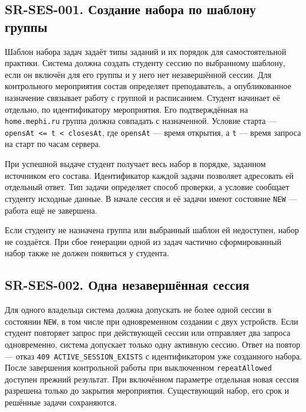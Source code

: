 \documentclass[12pt,a4paper]{article}
\begin{document}
\subsection{SR-SES-001. Создание набора по шаблону группы}\label{sr-ses-001-ux441ux43eux437ux434ux430ux43dux438ux435-ux43dux430ux431ux43eux440ux430-ux43fux43e-ux448ux430ux431ux43bux43eux43dux443-ux433ux440ux443ux43fux43fux44b}

\hypertarget{sr-ses-001-создание-набора-по-шаблону-группы}{}

\hypertarget{sr-ses-001}{}

Шаблон набора задач задаёт типы заданий и их порядок для самостоятельной практики. Система должна создать студенту сессию по выбранному шаблону, если он включён для его группы и у него нет незавершённой сессии. Для контрольного мероприятия состав определяет преподаватель, а опубликованное назначение связывает работу с группой и расписанием. Студент начинает её отдельно, по идентификатору мероприятия. Его подтверждённая на \texttt{home.\allowbreak{}mephi.\allowbreak{}ru} группа должна совпадать с назначенной. Условие старта --- \texttt{opensAt\ \textless{}=\ t\ \textless{}\ closesAt}, где \texttt{opensAt} --- время открытия, а \texttt{t} --- время запроса на старт по часам сервера.

При успешной выдаче студент получает весь набор в порядке, заданном источником его состава. Идентификатор каждой задачи позволяет адресовать ей отдельный ответ. Тип задачи определяет способ проверки, а условие сообщает студенту исходные данные. В начале сессия и её задачи имеют состояние \texttt{NEW} --- работа ещё не завершена.

Если студенту не назначена группа или выбранный шаблон ей недоступен, набор не создаётся. При сбое генерации одной из задач частично сформированный набор также не должен появиться у студента.

\subsection{SR-SES-002. Одна незавершённая сессия}\label{sr-ses-002-ux43eux434ux43dux430-ux43dux435ux437ux430ux432ux435ux440ux448ux451ux43dux43dux430ux44f-ux441ux435ux441ux441ux438ux44f}

\hypertarget{sr-ses-002-одна-незавершённая-сессия}{}

\hypertarget{sr-ses-002}{}

Для одного владельца система должна допускать не более одной сессии в состоянии \texttt{NEW}, в том числе при одновременном создании с двух устройств. Если студент повторяет запрос при действующей сессии или отправляет два запроса одновременно, система допускает только одну активную сессию. Ответ на повтор --- отказ \texttt{409 ACTIVE\_\allowbreak{}SESSION\_\allowbreak{}EXISTS} с идентификатором уже созданного набора. После завершения контрольной работы при выключенном \texttt{repeatAllowed} доступен прежний результат. При включённом параметре отдельная новая сессия разрешена только до закрытия мероприятия. Существующий набор, его срок и решённые задачи сохраняются.
\end{document}
